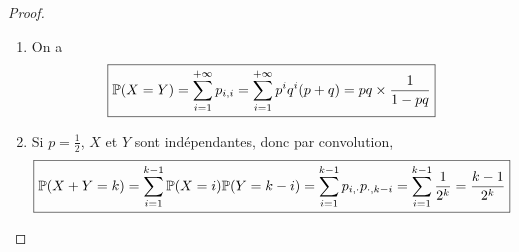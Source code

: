 \documentclass[12pt]{article}
\begin{document}
\begin{proof}
\begin{enumerate}
        \item On a 
        \begin{equation}
            \boxed{\P(X=Y)=\sum_{i=1}^{+\infty}p_{i,i}=\sum_{i=1}^{+\infty}p^{i}q^{i}(p+q)=pq\times\frac{1}{1-pq}}
        \end{equation}

        \item Si $p=\frac{1}{2}$, $X$ et $Y$ sont indépendantes, donc par convolution,
        \begin{equation}
            \boxed{\P(X+Y=k)=\sum_{i=1}^{k-1}\P(X=i)\P(Y=k-i)=\sum_{i=1}^{k-1}p_{i,\cdot}p_{\cdot,k-i}=\sum_{i=1}^{k-1}\frac{1}{2^{k}}=\frac{k-1}{2^{k}}}
        \end{equation}
    \end{enumerate}
\end{proof}
\end{document}
